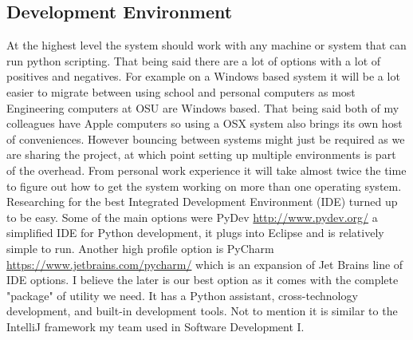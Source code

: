 \documentclass[10pt,draftclsnofoot,onecolumn,journal,compsoc]{IEEEtran}
\begin{document}
    \subsection{Development Environment}
    At the highest level the system should work with any machine or system that can run python scripting. That being said there are a lot of options with a lot of positives and negatives. For example on a Windows based system it will be a lot easier to migrate between using school and personal computers as most Engineering computers at OSU are Windows based. That being said both of my colleagues have Apple computers so using a OSX system also brings its own host of conveniences. However bouncing between systems might just be required as we are sharing the project, at which point setting up multiple environments is part of the overhead. From personal work experience it will take almost twice the time to figure out how to get the system working on more than one operating system.\\
    Researching for the best Integrated Development Environment (IDE) turned up to be easy. Some of the main options were PyDev \url{http://www.pydev.org/} a simplified IDE for Python development, it plugs into Eclipse and is relatively simple to run. Another high profile option is PyCharm \url{https://www.jetbrains.com/pycharm/} which is an expansion of Jet Brains line of IDE options. I believe the later is our best option as it comes with the complete "package" of utility we need. It has a Python assistant, cross-technology development, and built-in development tools. Not to mention it is similar to the IntelliJ framework my team used in Software Development I. 
  
  
    
    

   
\end{document}
